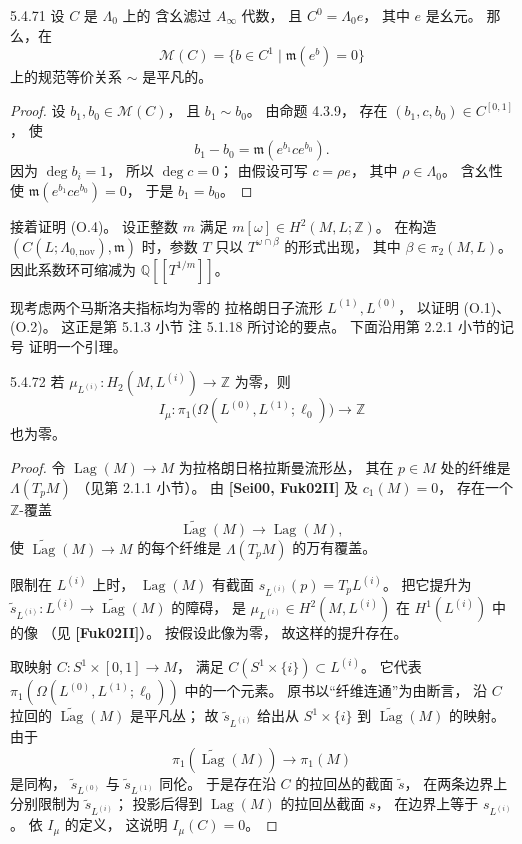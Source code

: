 \begin{lemma}{5.4.71}\label{lem:5-4-71}
设 $C$ 是 $\Lambda_0$ 上的
含幺滤过 $A_\infty$ 代数，
且 $C^0=\Lambda_0e$，
其中 $e$ 是幺元。
那么，在
\[
\widehat{\mathcal M}(C)
=\{b\in C^1\mid
\mathfrak m(e^b)=0\}
\]
上的规范等价关系 $\sim$
是平凡的。
\end{lemma}
\begin{proof}
设 $b_1,b_0\in\widehat{\mathcal M}(C)$，
且 $b_1\sim b_0$。
由命题 4.3.9，
存在
$(b_1,c,b_0)\in C^{[0,1]}$，
使
\[
b_1-b_0
=\mathfrak m(e^{b_1}ce^{b_0}).
\]
因为 $\deg b_i=1$，
所以 $\deg c=0$；
由假设可写 $c=\rho e$，
其中 $\rho\in\Lambda_0$。
含幺性使
$\mathfrak m(e^{b_1}ce^{b_0})=0$，
于是 $b_1=b_0$。
\end{proof}

接着证明 \textup{(O.4)}。
设正整数 $m$ 满足
$m[\omega]\in H^2(M,L;\mathbb Z)$。
在构造
$(C(L;\Lambda_{0,\mathrm{nov}}),\mathfrak m)$
时，参数 $T$ 只以
$T^{\omega\cap\beta}$ 的形式出现，
其中 $\beta\in\pi_2(M,L)$。
因此系数环可缩减为
$\mathbb Q[[T^{1/m}]]$。

现考虑两个马斯洛夫指标均为零的
拉格朗日子流形
$L^{(1)},L^{(0)}$，
以证明 \textup{(O.1)}、
\textup{(O.2)}。
这正是第 5.1.3 小节
注 5.1.18 所讨论的要点。
下面沿用第 2.2.1 小节的记号
证明一个引理。

\begin{lemma}{5.4.72}\label{lem:5-4-72}
若
$\mu_{L^{(i)}}:
H_2(M,L^{(i)})\to\mathbb Z$
为零，则
\[
I_\mu:
\pi_1\bigl(
\Omega(L^{(0)},L^{(1)};\ell_0)
\bigr)\longrightarrow\mathbb Z
\]
也为零。
\end{lemma}
\begin{proof}
令 $\operatorname{Lag}(M)\to M$
为拉格朗日格拉斯曼流形丛，
其在 $p\in M$ 处的纤维是
$\Lambda(T_pM)$
（见第 2.1.1 小节）。
由 \textbf{[Sei00, Fuk02II]}
及 $c_1(M)=0$，
存在一个 $\mathbb Z$-覆盖
\[
\widetilde{\operatorname{Lag}}(M)
\longrightarrow\operatorname{Lag}(M),
\]
使
$\widetilde{\operatorname{Lag}}(M)\to M$
的每个纤维是
$\Lambda(T_pM)$ 的万有覆盖。

限制在 $L^{(i)}$ 上时，
$\operatorname{Lag}(M)$
有截面
$s_{L^{(i)}}(p)
=T_pL^{(i)}$。
把它提升为
$\widetilde s_{L^{(i)}}:
L^{(i)}\to
\widetilde{\operatorname{Lag}}(M)$
的障碍，
是 $\mu_{L^{(i)}}\in
H^2(M,L^{(i)})$
在 $H^1(L^{(i)})$ 中的像
（见 \textbf{[Fuk02II]}）。
按假设此像为零，
故这样的提升存在。

取映射
$C:S^1\times[0,1]\to M$，
满足
$C(S^1\times\{i\})\subset L^{(i)}$。
它代表
$\pi_1(\Omega(L^{(0)},L^{(1)};\ell_0))$
中的一个元素。
原书以“纤维连通”为由断言，
沿 $C$ 拉回的
$\widetilde{\operatorname{Lag}}(M)$
是平凡丛；
故 $\widetilde s_{L^{(i)}}$
给出从
$S^1\times\{i\}$
到 $\widetilde{\operatorname{Lag}}(M)$
的映射。
由于
\[
\pi_1(\widetilde{\operatorname{Lag}}(M))
\longrightarrow\pi_1(M)
\]
是同构，
$\widetilde s_{L^{(0)}}$
与 $\widetilde s_{L^{(1)}}$
同伦。
于是存在沿 $C$ 的拉回丛的截面
$\widetilde s$，
在两条边界上分别限制为
$\widetilde s_{L^{(i)}}$；
投影后得到
$\operatorname{Lag}(M)$
的拉回丛截面 $s$，
在边界上等于
$s_{L^{(i)}}$。
依 $I_\mu$ 的定义，
这说明 $I_\mu(C)=0$。
\end{proof}

